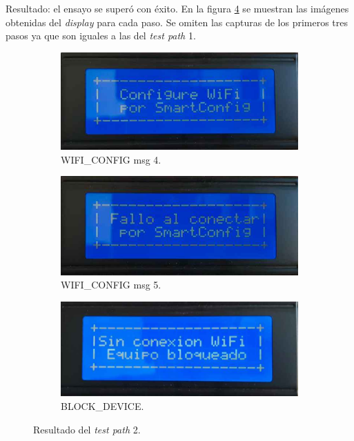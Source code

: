 Resultado: el ensayo se superó con éxito. En la figura \ref{fig:pruIni_2_res} se muestran las imágenes obtenidas del \textit{display} para cada paso. Se omiten las capturas de los primeros tres pasos ya que son iguales a las del \textit{test path} 1. 
 
\begin{figure}[!htpb]
     \centering
     \begin{subfigure}[b]{0.4\textwidth}
         \centering
         \includegraphics[width=1.1\textwidth]{./Figures/Conf_SmartConf.jpeg}
         \caption{WIFI\_CONFIG msg 4.}
         \label{fig:pruIni_2_1}
     \end{subfigure}
           \hfill
     \begin{subfigure}[b]{0.4\textwidth}
         \centering
         \includegraphics[width=1.1\textwidth]{./Figures/Fallo_SmartConf.jpeg}
         \caption{WIFI\_CONFIG msg 5.}
         \label{fig:pruIni_2_2}
     \end{subfigure}
           \hfill
     \begin{subfigure}[b]{0.4\textwidth}
         \centering
         \includegraphics[width=1.1\textwidth]{./Figures/Sin_Conex_WiFi_Eq_Bloq.jpeg}
         \caption{BLOCK\_DEVICE.}
         \label{fig:pruIni_2_3}
     \end{subfigure}
        \caption{Resultado del \textit{test path} 2.}
        \label{fig:pruIni_2_res}
\end{figure}

